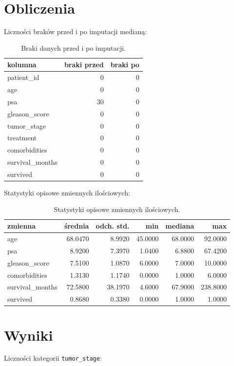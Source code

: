 \documentclass[12pt,a4paper]{article}
\begin{document}
\section{Obliczenia}
Liczności braków przed i po imputacji medianą:

\begin{table}[H]
\centering
\begin{tabular}{lrr}
\toprule
kolumna & braki przed & braki po \\
\midrule
patient\_id & 0 & 0 \\
age & 0 & 0 \\
psa & 30 & 0 \\
gleason\_score & 0 & 0 \\
tumor\_stage & 0 & 0 \\
treatment & 0 & 0 \\
comorbidities & 0 & 0 \\
survival\_months & 0 & 0 \\
survived & 0 & 0 \\
\bottomrule
\end{tabular}

\caption{Braki danych przed i po imputacji.}
\label{tab:missing}
\end{table}

Statystyki opisowe zmiennych ilościowych:

\begin{table}[H]
\centering
\begin{tabular}{lrrrrr}
\toprule
zmienna & średnia & odch. std. & min & mediana & max \\
\midrule
age & 68.0470 & 8.9920 & 45.0000 & 68.0000 & 92.0000 \\
psa & 8.9200 & 7.3970 & 1.0400 & 6.8800 & 67.4200 \\
gleason\_score & 7.5100 & 1.0870 & 6.0000 & 7.0000 & 10.0000 \\
comorbidities & 1.3130 & 1.1740 & 0.0000 & 1.0000 & 6.0000 \\
survival\_months & 72.5800 & 38.1970 & 4.6000 & 67.9000 & 238.8000 \\
survived & 0.8680 & 0.3380 & 0.0000 & 1.0000 & 1.0000 \\
\bottomrule
\end{tabular}

\caption{Statystyki opisowe zmiennych ilościowych.}
\label{tab:desc}
\end{table}


\section{Wyniki}
Liczności kategorii \texttt{tumor\_stage}:
\end{document}
